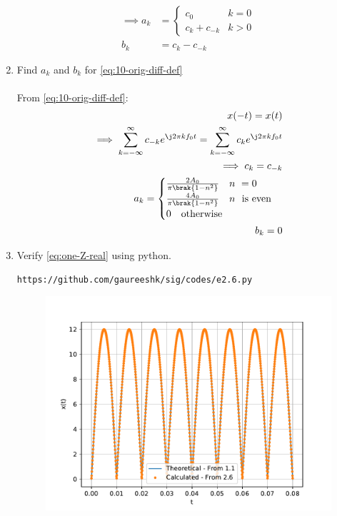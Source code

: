 \documentclass[journal,12pt,twocolumn]{IEEEtran}
\renewcommand\thesection{\arabic{section}}
\begin{document}
\begin{enumerate}[label=\thesection.\arabic*,ref=\thesection.\theenumi]
\begin{align}
	\implies
	a_k &= 
	\begin{cases}
		c_0 & k = 0 \\
		c_k + c_{-k} & k > 0
	\end{cases} \label{eq:ak} \\
	b_k &= c_k - c_{-k}
	\label{eq:bk}
\end{align}
\item Find $a_k$ and $b_k$ for 
\eqref{eq:10-orig-diff-def}\\
\solution\\
From \eqref{eq:10-orig-diff-def}:
\begin{align}
	x(-t) = x(t)\\
	\implies \sum_{k = -\infty}^{\infty}c_{-k}e^{\j2\pi kf_0t}
	= \sum_{k = -\infty}^{\infty}c_ke^{\j2\pi kf_0 t}\\
	\implies c_k = c_{-k}\\
	a_k = \begin{cases}
		\frac{2A_0}{\pi\brak{1-n^2}} \quad n\ = 0\\
		\frac{4A_0}{\pi\brak{1-n^2}} \quad n\ \text{ is even}\\
		0 \quad \text{otherwise}
	\end{cases}\\
	b_k = 0
\end{align}
\item Verify 
\eqref{eq:one-Z-real}
using python.
\begin{lstlisting}
https://github.com/gaureeshk/sig/codes/e2.6.py
\end{lstlisting}
\begin{figure}[!ht]
	\begin{center}
		\includegraphics[width=\columnwidth]{./figs/e2.6.pdf}
	\end{center}
	\label{fig:ft}	
\end{figure}
\end{enumerate}
\end{document}

